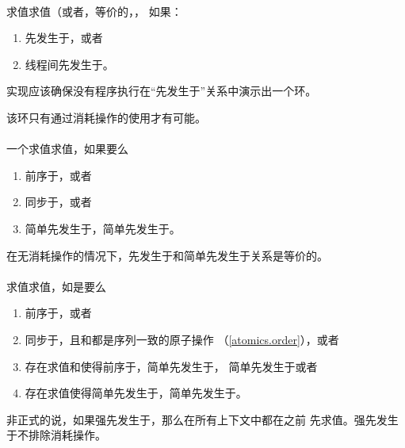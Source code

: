 \paragraph{} %
 求值求值（或者，等价的，，
 如果：
 \begin{enumerate}
  \item {}先发生于，或者
  \item {}线程间先发生于。
 \end{enumerate}
 实现应该确保没有程序执行在“先发生于”关系中演示出一个环。

\begin{note}
  该环只有通过消耗操作的使用才有可能。
\end{note}

\paragraph{} %
一个求值求值，如果要么
\begin{enumerate}
  \item {}前序于，或者
  \item {}同步于，或者
  \item {}简单先发生于，简单先发生于。
\end{enumerate}

\begin{note}
  在无消耗操作的情况下，先发生于和简单先发生于关系是等价的。
\end{note}

\paragraph{} %
求值求值，如是要么
\begin{enumerate}
  \item {}前序于，或者
  \item {}同步于，且和都是序列一致的原子操作
        （\ref{atomics.order}），或者
  \item 存在求值和使得前序于，简单先发生于，
        简单先发生于或者
  \item 存在求值使得简单先发生于，简单先发生于。
\end{enumerate}

\begin{note}
  非正式的说，如果强先发生于，那么在所有上下文中都在之前
  先求值。强先发生于不排除消耗操作。
\end{note}

